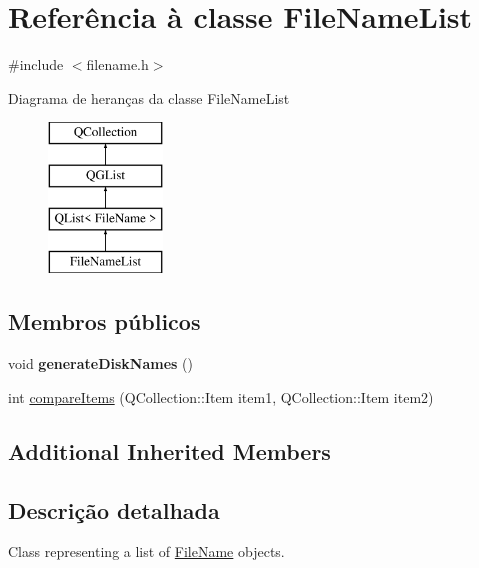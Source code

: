 \hypertarget{class_file_name_list}{\section{Referência à classe File\-Name\-List}
\label{class_file_name_list}
}


{\ttfamily \#include $<$filename.\-h$>$}

Diagrama de heranças da classe File\-Name\-List\begin{figure}[H]
\begin{center}
\leavevmode
\includegraphics[height=4.000000cm]{class_file_name_list}
\end{center}
\end{figure}
\subsection*{Membros públicos}
\begin{DoxyCompactItemize}
\item 
\hypertarget{class_file_name_list_a9887211fd6309b5672ee9d5bfdd251f7}{void {\bfseries generate\-Disk\-Names} ()}\label{class_file_name_list_a9887211fd6309b5672ee9d5bfdd251f7}

\item 
int \hyperlink{class_file_name_list_a219450accf048597ffc7113ecde4c402}{compare\-Items} (Q\-Collection\-::\-Item item1, Q\-Collection\-::\-Item item2)
\end{DoxyCompactItemize}
\subsection*{Additional Inherited Members}


\subsection{Descrição detalhada}
Class representing a list of \hyperlink{class_file_name}{File\-Name} objects. 

